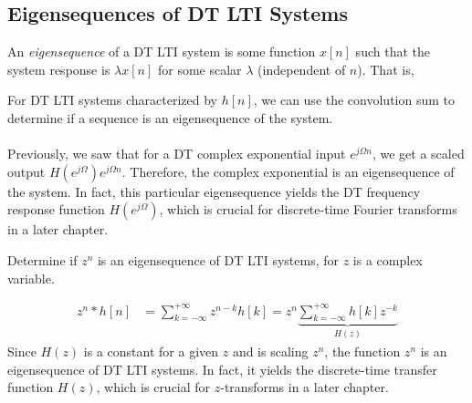 \documentclass{report}
\begin{document}
\subsection{Eigensequences of DT LTI Systems}
An \emph{eigensequence} of a DT LTI system is some function $x[n]$ such that the system response is $\lambda x[n]$ for some scalar $\lambda$ (independent of $n$). That is,  
\begin{center}
\end{center}
For DT LTI systems characterized by $h[n]$, we can use the convolution sum to determine if a sequence 
is an eigensequence of the system. 
\\ \\
Previously, we saw that for a DT complex exponential input $e^{j\Omega n}$, 
we get a scaled output $H(e^{j\Omega})e^{j\Omega n}$. Therefore, the complex exponential is an eigensequence of the system. 
In fact, this particular eigensequence yields the DT frequency response function $H(e^{j\Omega})$, which is crucial for discrete-time Fourier transforms 
in a later chapter.

\begin{example}
    Determine if $z^n$ is an eigensequence of DT LTI systems, for $z$ is a complex variable.
\end{example}
\begin{solution}
    \begin{align*}
        z^n * h[n] &= \sum_{k=-\infty}^{+\infty} z^{n-k}h[k] = z^n \underbrace{\sum_{k=-\infty}^{+\infty} h[k]z^{-k} }_\textrm{$H(z)$}
    \end{align*}
    Since $H(z)$ is a constant for a given $z$ and is scaling $z^n$, the function $z^n$ is an eigensequence of DT LTI systems. 
    In fact, it yields the discrete-time transfer function $H(z)$, which is crucial for $z$-transforms in a later chapter.
    \\ \\ 
    \begin{center}
    \end{center}
\end{solution}
\end{document}

